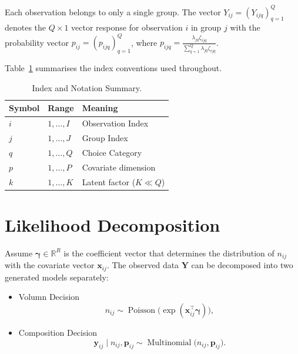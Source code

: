 \documentclass[]{report}
\theoremstyle{definition}
\begin{document}
Each observation belongs to only a single group. The vector $Y_{ij}=(Y_{ijq})_{q=1}^{Q}$ denotes the $Q\times 1$ vector response for observation $i$ in group $j$ with the probability vector $p_{ij}=(p_{ijq})_{q=1}^{Q}$, where $p_{ijq}=\frac{\lambda_{jq}\zeta_{ijq}}{\sum_{q=1}^{Q}\lambda_{jq}\zeta_{ijq}}$. 

\medskip
\noindent Table~\ref{tab:notation} summarises the index conventions
used throughout.

\begin{table}[h]
\centering
\caption{Index and Notation Summary.}
\label{tab:notation}
\begin{tabular}{lll}
\toprule
Symbol & Range & Meaning \\
\midrule
$i$ & $1,\ldots,I$& Observation Index\\
$j$ & $1,\ldots,J$& Group Index\\
$q$ & $1,\ldots,Q$ & Choice Category\\
$p$& $1,\ldots,P$& Covariate dimension \\
$k$ & $1,\ldots,K$ & Latent factor ($K\ll Q$) \\
\end{tabular}
\end{table}
\section{Likelihood Decomposition}
\label{likelihood_decomposition}
Assume $\bm{\gamma}\in \mathbb{R}^{R}$ is the coefficient vector that determines the distribution of $n_{ij}$ with the covariate vector $\bm{x}_{ij}$. The observed data $\bm{Y}$ can be decomposed into two generated models separately:
    \begin{itemize}
    \item Volumn Decision
        \begin{equation}
            n_{ij} \sim \operatorname{Poisson}\!\bigl(\exp(\bm{x}_{ij}^\top\bm{\gamma})\bigr),
        \label{eq:volume}
    \end{equation}
    \item Composition Decision
    \begin{equation}
        \bm{y}_{ij} \mid n_{ij}, \bm{p}_{ij} \sim \operatorname{Multinomial}\bigl(n_{ij}, \bm{p}_{ij}\bigr).
        \label{eg:composition}
    \end{equation}
    \end{itemize}
\end{document}
